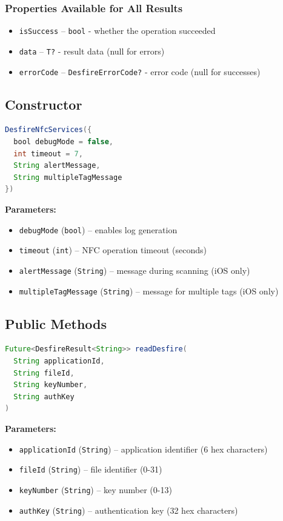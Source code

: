\documentclass[a4paper,12pt]{article}
\begin{document}
\newpage

\subsubsection*{Properties Available for All Results}
\begin{itemize}
    \item \texttt{isSuccess} -- \texttt{bool} - whether the operation succeeded
    \item \texttt{data} -- \texttt{T?} - result data (null for errors)
    \item \texttt{errorCode} -- \texttt{DesfireErrorCode?} - error code (null for successes)
\end{itemize}

\subsection{Constructor}
\begin{lstlisting}[language=Java]
DesfireNfcServices({
  bool debugMode = false, 
  int timeout = 7, 
  String alertMessage, 
  String multipleTagMessage
})
\end{lstlisting}

\textbf{Parameters:}
    \begin{itemize}
        \item \texttt{debugMode} (\texttt{bool}) -- enables log generation
        \item \texttt{timeout} (\texttt{int}) -- NFC operation timeout (seconds)
        \item \texttt{alertMessage} (\texttt{String}) -- message during scanning (iOS only)
        \item \texttt{multipleTagMessage} (\texttt{String}) -- message for multiple tags (iOS only)
\end{itemize}

\subsection{Public Methods}
\begin{lstlisting}[language=Java]
Future<DesfireResult<String>> readDesfire(
  String applicationId, 
  String fileId, 
  String keyNumber, 
  String authKey
)
\end{lstlisting}

\textbf{Parameters:}
    \begin{itemize}
        \item \texttt{applicationId} (\texttt{String}) -- application identifier (6 hex characters)
        \item \texttt{fileId} (\texttt{String}) -- file identifier (0-31)
        \item \texttt{keyNumber} (\texttt{String}) -- key number (0-13)
        \item \texttt{authKey} (\texttt{String}) -- authentication key (32 hex characters)
    \end{itemize}
\end{document}
